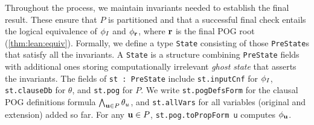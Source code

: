Throughout the process,
we maintain invariants needed to establish the final result.
These ensure that $P$ is partitioned
and that a successful final check entails the logical equivalence
of $\phi_I$ and $\phi_{\mathbf{r}}$,
where $\mathbf{r}$ is the final POG root (\ref{thm:lean:equiv}).
Formally, we define a type {\tt State}
consisting of those {\tt PreState}s
that satisfy all the invariants.
A {\tt State} is a structure
combining {\tt PreState} fields with additional ones
storing computationally irrelevant \emph{ghost state}
that asserts the invariants.
The fields of \lstinline{st : PreState} include
\lstinline{st.inputCnf} for $\phi_I$,
\lstinline{st.clauseDb} for $\theta$,
and \lstinline{st.pog} for $P$.
We write \lstinline{st.pogDefsForm} for the clausal POG definitions formula $\bigwedge_{\mathbf{u}\in P}\theta_u$,
and \lstinline{st.allVars} for all variables (original and extension) added so far.
For any $\mathbf{u}\in P$,
\lstinline{st.pog.toPropForm u} computes $\phi_{\mathbf{u}}$.

